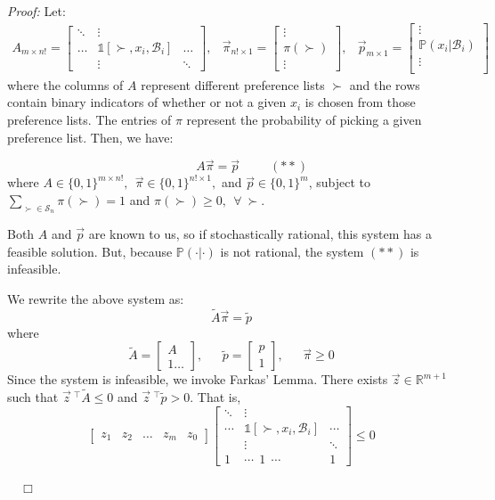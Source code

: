 \documentclass[11pt]{article}
\newcommand{\B}{\mathcal{B}}
\renewcommand{\S}{\mathcal{S}}
\newenvironment{proof}{\noindent\emph{Proof:}}{$\quad \Box$}
\begin{document}
\begin{proof}
Let:
\[ \begin{array}{ccc} A_{m\times n!}= 
	\begin{bmatrix} 
		\ddots & \vdots &   \\
		\ldots & \mathds{1}{[\succ, x_i, \B_i]} & \ldots \\
		 & \vdots & \ddots 
	\end{bmatrix},  
	&
\vec{\pi}_{n! \times 1} = 
	\begin{bmatrix} 
		\vdots \\ 
		\pi(\succ) \\ 
		\vdots 
	\end{bmatrix}, 
	&
\vec{p}_{m \times 1 } = \begin{bmatrix}
		\vdots \\
		\mathbb{P}(x_i | \B_i) \\
		\vdots \\
	\end{bmatrix}
\end{array}\]
where the columns of $A$ represent different preference lists $\succ$ and the rows contain binary indicators of whether or not a given $x_i$ is chosen from those preference lists. The entries of $\pi$ represent the probability of picking a given preference list. Then, we have:

$$~~~~~~~~~~~~~~~A \vec{\pi} = \vec{p}~~~~~~~~~~~(**)$$
where $
A \in \{0,1\}^{m \times n!}, 
~~\vec{\pi} \in \{0,1\}^{n! \times 1},$ and $\vec{p} \in \{0,1\}^m$, 
subject to $\sum_{\succ \in \S_n} \pi(\succ)=1$ and $\pi(\succ) \geq 0, ~~\forall~\succ$. 

Both $A$ and $\vec{p}$ are known to us, so if stochastically rational, this system has a feasible solution. But, because $\mathbb{P}(\cdot | \cdot)$ is not rational, the system $(**)$ is infeasible.

We rewrite the above system as:
$$\tilde{A} \vec{\pi} = \tilde{p}$$
where $$\tilde{A} = \begin{bmatrix}A \\ \hline 1 \ldots \end{bmatrix}, 
~~~~~~~\tilde{p} = \begin{bmatrix}p \\  \hline 1  \end{bmatrix},~~~~~~~\vec{\pi}\geq 0$$
Since the system is infeasible, we invoke Farkas' Lemma. There exists $\vec{z} \in \mathbb{R}^{m+1}$ such that $\vec{z}~^\top \tilde{A} \leq 0$ and $\vec{z}~^\top \tilde{p}>0$. That is,
$$ 
\begin{bmatrix}
z_1 & z_2 & \ldots & z_m & z_0
\end{bmatrix}
\begin{bmatrix}
\ddots & \vdots & \\
\cdots & \mathds{1}[\succ, x_i, \B_i] & \cdots \\
& \vdots & \ddots \\
\hline
1  & \cdots ~~1~~ \cdots & 1
\end{bmatrix} 
\leq 0$$


\end{proof}
\end{document}
